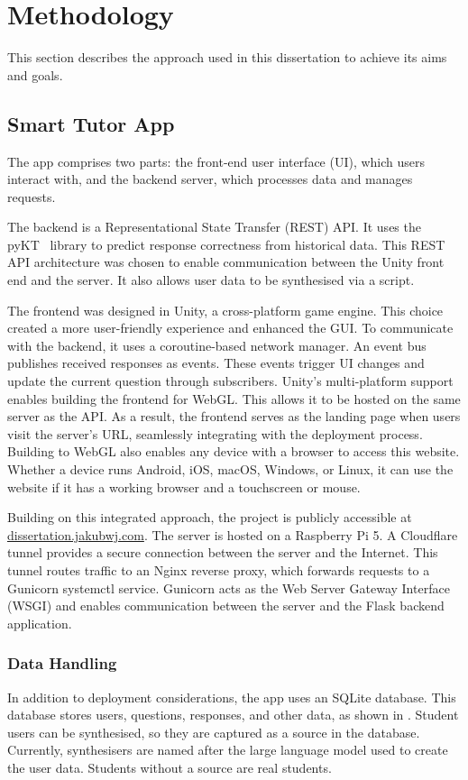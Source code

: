 \chapter{Methodology}
This section describes the approach used in this dissertation to achieve its aims and goals.

\section{Smart Tutor App}
The app comprises two parts: the front-end user interface (UI), which users interact with, and the backend server, which processes data and manages requests.

The backend is a Representational State Transfer (REST) API\@. It uses the pyKT~\autocite{pyktPaper} library to predict response correctness from historical data. This REST API architecture was chosen to enable communication between the Unity front end and the server. It also allows user data to be synthesised via a script.

The frontend was designed in Unity, a cross-platform game engine. This choice created a more user-friendly experience and enhanced the GUI\@. To communicate with the backend, it uses a coroutine-based network manager. An event bus publishes received responses as events. These events trigger UI changes and update the current question through subscribers. Unity's multi-platform support enables building the frontend for WebGL\@. This allows it to be hosted on the same server as the API\@. As a result, the frontend serves as the landing page when users visit the server's URL, seamlessly integrating with the deployment process. Building to WebGL also enables any device with a browser to access this website. Whether a device runs Android, iOS, macOS, Windows, or Linux, it can use the website if it has a working browser and a touchscreen or mouse.

Building on this integrated approach, the project is publicly accessible at \href{https://dissertation.jakubwj.com}{dissertation.jakubwj.com}. The server is hosted on a Raspberry Pi 5. A Cloudflare tunnel provides a secure connection between the server and the Internet. This tunnel routes traffic to an Nginx reverse proxy, which forwards requests to a Gunicorn systemctl service. Gunicorn acts as the Web Server Gateway Interface (WSGI) and enables communication between the server and the Flask backend application.

\subsection{Data Handling}
In addition to deployment considerations, the app uses an SQLite database. This database stores users, questions, responses, and other data, as shown in . Student users can be synthesised, so they are captured as a source in the database. Currently, synthesisers are named after the large language model used to create the user data. Students without a source are real students.

